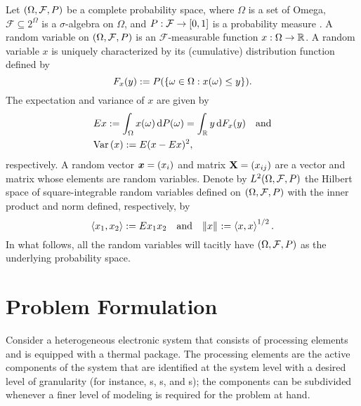 Let $(\Omega, \mathcal{F}, \probability)$ be a complete probability space, where
$\Omega$ is a set of Omega, $\mathcal{F} \subseteq 2^\Omega$ is a
$\sigma$-algebra on $\Omega$, and $\probability: \mathcal{F} \to [0, 1]$ is a
probability measure \cite{durrett2010}. A random variable on $(\Omega,
\mathcal{F}, \probability)$ is an $\mathcal{F}$-measurable function $x: \Omega
\to \mathbb{R}$. A random variable $x$ is uniquely characterized by its (cumulative)
distribution function defined by
\begin{equation*}
  F_x(y) := \probability(\{ \omega \in \Omega: x(\omega) \leq y \}).
\end{equation*}
The expectation and variance of $x$ are given by
\begin{align*}
  & \expectation{x} := \int_\Omega x(\omega) \, \d{\probability(\omega)} = \int_\real y \, \d{F_x(y)} \hspace{1em} \text{and} \\
  & \variance{x} := \expectation{(x - \expectation{x})^2},
\end{align*}
respectively. A random vector $\boldsymbol{x} = (x_i)$ and matrix $\mathbf{X} = (x_{ij})$ are
a vector and matrix whose elements are random variables. Denote by
$\L{2}(\Omega, \mathcal{F}, \probability)$ the Hilbert space of
square-integrable random variables \cite{janson1997} defined on $(\Omega,
\mathcal{F}, \probability)$ with the inner product and norm defined,
respectively, by
\begin{equation*}
  \innerproduct{x_1}{x_2} := \expectation{x_1 x_2} \hspace{1em} \text{and} \hspace{1em}
  \norm{x} := \innerproduct{x}{x}^{1/2}.
\end{equation*}
In what follows, all the random variables will tacitly have $(\Omega,
\mathcal{F}, \probability)$ as the underlying probability space.

\section{Problem Formulation}

Consider a heterogeneous electronic system that consists of \np processing
elements and is equipped with a thermal package. The processing elements are the
active components of the system that are identified at the system level with a
desired level of granularity (for instance, s, s, and
s); the components can be subdivided whenever a finer level of modeling
is required for the problem at hand.

